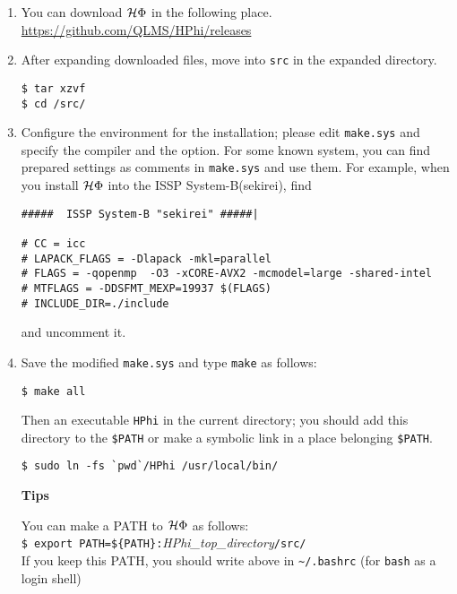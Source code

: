 \begin{enumerate}

\item You can download $\mathcal{H} \Phi$ in the following place.\\
\url{https://github.com/QLMS/HPhi/releases}

\item After expanding downloaded files, 
move into \verb|src| in the expanded directory.
\begin{verbatim}
$ tar xzvf 
$ cd /src/
\end{verbatim}

\item Configure the environment for the installation;
  please edit \verb|make.sys| and specify the compiler and the option.
  For some known system, 
  you can find prepared settings as comments in \verb|make.sys| and use them.
  For example, when you install $\mathcal{H} \Phi$ into the ISSP System-B(sekirei),
  find 
\begin{verbatim}
#####  ISSP System-B "sekirei" #####|

# CC = icc
# LAPACK_FLAGS = -Dlapack -mkl=parallel 
# FLAGS = -qopenmp  -O3 -xCORE-AVX2 -mcmodel=large -shared-intel
# MTFLAGS = -DDSFMT_MEXP=19937 $(FLAGS)
# INCLUDE_DIR=./include
\end{verbatim}
and uncomment it.

\item Save the modified \verb|make.sys| and type \verb|make| as follows:
\begin{verbatim}
$ make all
\end{verbatim}

Then an executable \verb|HPhi| in the current directory;
you should add this directory to the \verb|$PATH| or
make a symbolic link in a place belonging \verb|$PATH|.
\begin{verbatim}
$ sudo ln -fs `pwd`/HPhi /usr/local/bin/
\end{verbatim}

\begin{screen}
\Large 
{\bf Tips}
\normalsize

You can make a PATH to $\mathcal{H} \Phi$ as follows:
\\
\verb|$ export PATH=${PATH}:|\textit{HPhi\_top\_directory}\verb|/src/|
\\
If you keep this PATH, you should write above in \verb|~/.bashrc|
(for \verb|bash| as a login shell)

\end{screen}

\end{enumerate}
